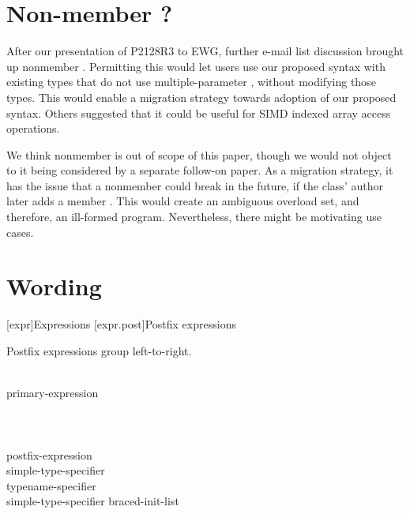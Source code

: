 \documentclass{wg21}
\begin{document}
\section{Non-member ?}

After our presentation of P2128R3 to EWG, further e-mail list discussion brought up nonmember .  Permitting this would let users use our proposed  syntax with existing types that do not use multiple-parameter , without modifying those types.  This would enable a migration strategy towards adoption of our proposed syntax.  Others suggested that it could be useful for SIMD indexed array access operations.

We think nonmember  is out of scope of this paper, though we would not object to it being considered by a separate follow-on paper.  As a migration strategy, it has the issue that a nonmember  could break in the future, if the class' author later adds a member .  This would create an ambiguous overload set, and therefore, an ill-formed program.  Nevertheless, there might be motivating use cases.


\section{Wording}

[expr]{Expressions}
[expr.post]{Postfix expressions}%

\pnum
Postfix expressions group left-to-right.

\begin{bnf}
\\
primary-expression\\
\\
\\
\\
postfix-expression \terminal{(}  \terminal{)}\\
simple-type-specifier \terminal{(}  \terminal{)}\\
typename-specifier \terminal{(}  \terminal{)}\\
simple-type-specifier braced-init-list\\
\end{bnf}
\end{document}
